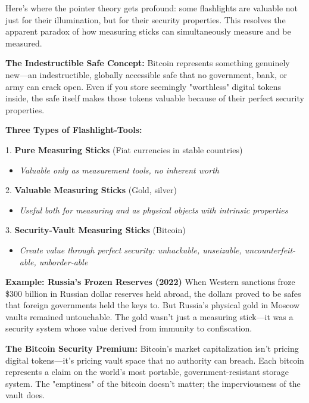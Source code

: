 \documentclass[11pt,oneside]{book}
\begin{document}
Here's where the pointer theory gets profound: some flashlights are valuable not just for their illumination, but for their security properties. This resolves the apparent paradox of how measuring sticks can simultaneously measure and be measured.

\textbf{The Indestructible Safe Concept:}
Bitcoin represents something genuinely new—an indestructible, globally accessible safe that no government, bank, or army can crack open. Even if you store seemingly "worthless" digital tokens inside, the safe itself makes those tokens valuable because of their perfect security properties.

\textbf{Three Types of Flashlight-Tools:}


1. \textbf{Pure Measuring Sticks} (Fiat currencies in stable countries)

\begin{itemize}
\item \textit{Valuable only as measurement tools, no inherent worth}
\end{itemize}


2. \textbf{Valuable Measuring Sticks} (Gold, silver)

\begin{itemize}
\item \textit{Useful both for measuring and as physical objects with intrinsic properties}
\end{itemize}


3. \textbf{Security-Vault Measuring Sticks} (Bitcoin)

\begin{itemize}
\item \textit{Create value through perfect security: unhackable, unseizable, uncounterfeit-able, unborder-able}
\end{itemize}

\textbf{Example: Russia's Frozen Reserves (2022)}
When Western sanctions froze \$300 billion in Russian dollar reserves held abroad, the dollars proved to be safes that foreign governments held the keys to. But Russia's physical gold in Moscow vaults remained untouchable. The gold wasn't just a measuring stick—it was a security system whose value derived from immunity to confiscation.

\textbf{The Bitcoin Security Premium:}
Bitcoin's market capitalization isn't pricing digital tokens—it's pricing vault space that no authority can breach. Each bitcoin represents a claim on the world's most portable, government-resistant storage system. The "emptiness" of the bitcoin doesn't matter; the imperviousness of the vault does.
\end{document}
